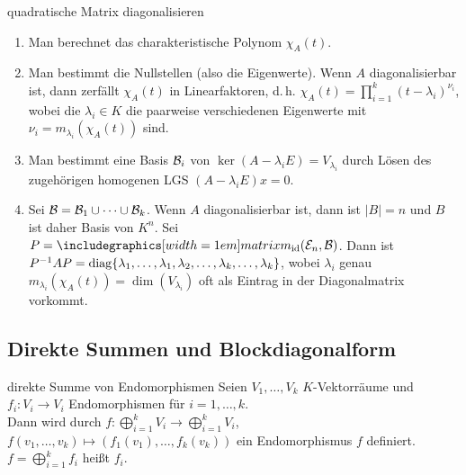 \begin{Prozedur}{quadratische Matrix diagonalisieren}
    \begin{enumerate}
        \item Man berechnet das charakteristische Polynom $\chi_A(t)$.
        
        \item Man bestimmt die Nullstellen (also die Eigenwerte).
        Wenn $A$ diagonalisierbar ist, dann zerfällt $\chi_A(t)$ in
        Linearfaktoren, d.\,h.
        $\chi_A(t) = \prod_{i=1}^k (t - \lambda_i)^{\nu_i}$,
        wobei die $\lambda_i \in K$ die paarweise verschiedenen Eigenwerte
        mit $\nu_i = m_{\lambda_i}(\chi_A(t))$ sind.
        
        \item Man bestimmt eine Basis $\mathcal{B}_i$ von
        $\ker(A - \lambda_i E) = V_{\lambda_i}$ durch
        Lösen des zugehörigen homogenen LGS $(A - \lambda_i E)x = 0$.
        
        \item Sei $\mathcal{B} = \mathcal{B}_1 \cup \cdots \cup \mathcal{B}_k$.
        Wenn $A$ diagonalisierbar ist, dann ist $|B| = n$ und $B$ ist daher
        Basis von $K^n$.
        Sei $P = \hommatrix{\id}{\stdbasis{n}}{B}$.
        Dann ist $P^{-1}AP = \operatorname{diag}\{\lambda_1, \ldots, \lambda_1, \lambda_2,
        \ldots, \lambda_k, \ldots, \lambda_k\}$, wobei
        $\lambda_i$ genau $m_{\lambda_i}(\chi_A(t)) = \dim(V_{\lambda_i})$
        oft als Eintrag in der Diagonalmatrix vorkommt.
    \end{enumerate}
\end{Prozedur}

\subsection{%
    Direkte Summen und Blockdiagonalform%
}

\begin{Def}{direkte Summe von Endomorphismen}
    Seien $V_1, \ldots, V_k$ $K$-Vektorräume und $f_i: V_i \rightarrow V_i$
    Endomorphismen für $i = 1, \ldots, k$. \\
    Dann wird durch $f: \bigoplus_{i=1}^k V_i \rightarrow
    \bigoplus_{i=1}^k V_i$, $f(v_1, \ldots, v_k) \mapsto
    (f_1(v_1), \ldots, f_k(v_k))$ ein Endomorphismus $f$ definiert.
    $f = \bigoplus_{i=1}^k f_i$ heißt
     $f_i$.
\end{Def}

